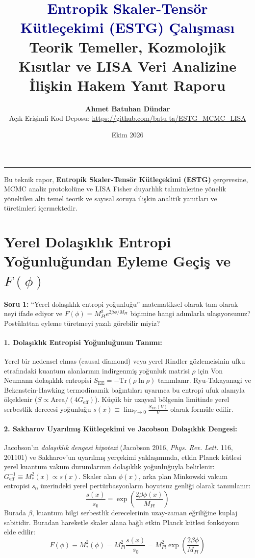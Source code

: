 \documentclass[11pt,a4paper]{article}
\title{\textcolor{navy}{\textbf{Entropik Skaler-Tensör Kütleçekimi (ESTG) Çalışması}} \\ \large Teorik Temeller, Kozmolojik Kısıtlar ve LISA Veri Analizine İlişkin Hakem Yanıt Raporu}
\author{\textbf{Ahmet Batuhan Dündar} \\ \small Açık Erişimli Kod Deposu: \url{https://github.com/batu-ta/ESTG_MCMC_LISA}}
\date{Ekim 2026}
\begin{document}
\maketitle

\hrule
\vspace{1em}

Bu teknik rapor, \textbf{Entropik Skaler-Tensör Kütleçekimi (ESTG)} çerçevesine, MCMC analiz protokolüne ve LISA Fisher duyarlılık tahminlerine yönelik yöneltilen altı temel teorik ve sayısal soruya ilişkin analitik yanıtları ve türetimleri içermektedir.

\section{Yerel Dolaşıklık Entropi Yoğunluğundan Eyleme Geçiş ve $F(\phi)$}

\begin{questionbox}
\textbf{Soru 1:} “Yerel dolaşıklık entropi yoğunluğu” matematiksel olarak tam olarak neyi ifade ediyor ve $F(\phi) = M_{Pl}^2 e^{2\beta\phi/M_{Pl}}$ biçimine hangi adımlarla ulaşıyorsunuz? Postülattan eyleme türetmeyi yazılı görebilir miyiz?
\end{questionbox}

\paragraph{1. Dolaşıklık Entropisi Yoğunluğunun Tanımı:}
Yerel bir nedensel elmas (causal diamond) veya yerel Rindler gözlemcisinin ufku etrafındaki kuantum alanlarının indirgenmiş yoğunluk matrisi $\rho$ için Von Neumann dolaşıklık entropisi $S_{\text{EE}} = -\text{Tr}(\rho \ln \rho)$ tanımlanır. Ryu-Takayanagi ve Bekenstein-Hawking termodinamik bağıntıları uyarınca bu entropi ufuk alanıyla ölçeklenir ($S \propto \text{Area} / (4G_{\text{eff}})$). Küçük bir uzaysal bölgenin limitinde yerel serbestlik derecesi yoğunluğu $s(x) \equiv \lim_{V \to 0} \frac{S_{\text{EE}}(V)}{V}$ olarak formüle edilir.

\paragraph{2. Sakharov Uyarılmış Kütleçekimi ve Jacobson Dolaşıklık Dengesi:}
Jacobson'ın \textit{dolaşıklık dengesi hipotezi} (Jacobson 2016, \textit{Phys. Rev. Lett.} 116, 201101) ve Sakharov'un uyarılmış yerçekimi yaklaşımında, etkin Planck kütlesi yerel kuantum vakum durumlarının dolaşıklık yoğunluğuyla belirlenir: $G_{\text{eff}}^{-1} \equiv M_*^2(x) \propto s(x)$. Skaler alan $\phi(x)$, arka plan Minkowski vakum entropisi $s_0$ üzerindeki yerel pertürbasyonların boyutsuz genliği olarak tanımlanır:
\begin{equation}
\frac{s(x)}{s_0} = \exp\left( \frac{2\beta \phi(x)}{M_{Pl}} \right)
\end{equation}
Burada $\beta$, kuantum bilgi serbestlik derecelerinin uzay-zaman eğriliğine kuplaj sabitidir. Buradan hareketle skaler alana bağlı etkin Planck kütlesi fonksiyonu elde edilir:
\begin{equation}
F(\phi) \equiv M_*^2(\phi) = M_{Pl}^2 \frac{s(x)}{s_0} = M_{Pl}^2 \exp\left( \frac{2\beta \phi}{M_{Pl}} \right)
\end{equation}
\end{document}
